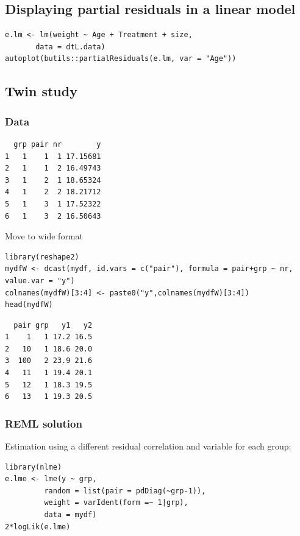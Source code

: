 \documentclass{article}
\begin{document}
\subsection{Displaying partial residuals in a linear model}
\label{sec:org693bf8b}
\lstset{language=r,label= ,caption= ,captionpos=b,numbers=none}
\begin{lstlisting}
e.lm <- lm(weight ~ Age + Treatment + size,
	   data = dtL.data)
autoplot(butils::partialResiduals(e.lm, var = "Age"))
\end{lstlisting}

\subsection{Twin study}
\label{sec:orgeaa1703}
\subsubsection{Data}
\label{sec:org7c0fad4}

\begin{verbatim}
  grp pair nr        y
1   1    1  1 17.15681
2   1    1  2 16.49743
3   1    2  1 18.65324
4   1    2  2 18.21712
5   1    3  1 17.52322
6   1    3  2 16.50643
\end{verbatim}

Move to wide format
\lstset{language=r,label= ,caption= ,captionpos=b,numbers=none}
\begin{lstlisting}
library(reshape2)
mydfW <- dcast(mydf, id.vars = c("pair"), formula = pair+grp ~ nr, value.var = "y")
colnames(mydfW)[3:4] <- paste0("y",colnames(mydfW)[3:4])
head(mydfW)
\end{lstlisting}

\begin{verbatim}
  pair grp   y1   y2
1    1   1 17.2 16.5
2   10   1 18.6 20.0
3  100   2 23.9 21.6
4   11   1 19.4 20.1
5   12   1 18.3 19.5
6   13   1 19.3 20.5
\end{verbatim}

\subsubsection{REML solution}
\label{sec:org3764d2b}
Estimation using a different residual correlation and variable for each group:
\lstset{language=r,label= ,caption= ,captionpos=b,numbers=none}
\begin{lstlisting}
library(nlme)
e.lme <- lme(y ~ grp,
	     random = list(pair = pdDiag(~grp-1)),
	     weight = varIdent(form =~ 1|grp),
	     data = mydf)
2*logLik(e.lme)
\end{lstlisting}
\end{document}
